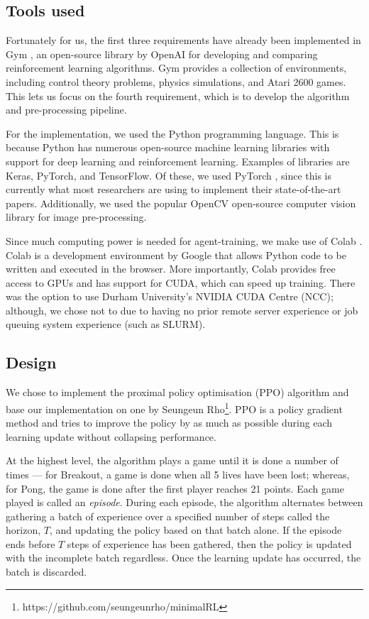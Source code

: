 \documentclass[12pt,a4paper]{article}
\begin{document}
\subsection{Tools used}
Fortunately for us, the first three requirements have already been implemented in Gym \cite{1606.01540}, an open-source library by OpenAI for developing and comparing reinforcement learning algorithms. Gym provides a collection of environments, including control theory problems, physics simulations, and Atari 2600 games. This lets us focus on the fourth requirement, which is to develop the algorithm and pre-processing pipeline.

For the implementation, we used the Python programming language. This is because Python has numerous open-source machine learning libraries with support for deep learning and reinforcement learning. Examples of libraries are Keras, PyTorch, and TensorFlow. Of these, we used PyTorch \cite{NEURIPS2019_9015}, since this is currently what most researchers are using to implement their state-of-the-art papers. Additionally, we used the popular OpenCV \cite{opencv_library} open-source computer vision library for image pre-processing.

Since much computing power is needed for agent-training, we make use of Colab \cite{}. Colab is a development environment by Google that allows Python code to be written and executed in the browser. More importantly, Colab provides free access to GPUs and has support for CUDA, which can speed up training. There was the option to use Durham University's NVIDIA CUDA Centre (NCC); although, we chose not to due to having no prior remote server experience or job queuing system experience (such as SLURM).

\subsection{Design}
We chose to implement the proximal policy optimisation (PPO) algorithm \cite{DBLP:journals/corr/SchulmanWDRK17} and base our implementation on one by Seungeun Rho\footnote{https://github.com/seungeunrho/minimalRL}. PPO is a policy gradient method and tries to improve the policy by as much as possible during each learning update without collapsing performance. 

At the highest level, the algorithm plays a game until it is done a number of times --- for Breakout, a game is done when all 5 lives have been lost; whereas, for Pong, the game is done after the first player reaches 21 points. Each game played is called an \emph{episode}. During each episode, the algorithm alternates between gathering a batch of experience over a specified number of steps called the horizon, $T$, and updating the policy based on that batch alone. If the episode ends before $T$ steps of experience has been gathered, then the policy is updated with the incomplete batch regardless. Once the learning update has occurred, the batch is discarded.  
\end{document}
